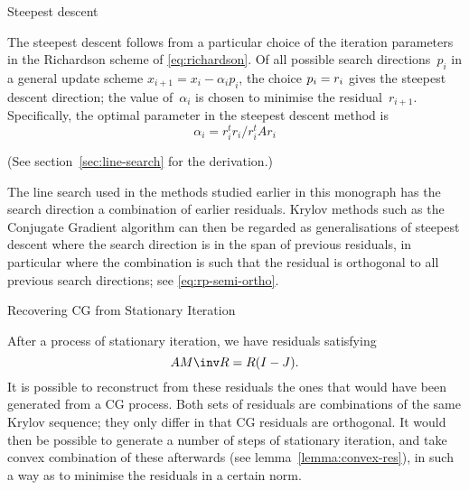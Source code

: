  {Steepest descent}
\label{sec:steepest-descent}

The steepest descent follows from a particular choice of the iteration
parameters in the Richardson scheme of \eqref{eq:richardson}.
Of all possible search directions~$p_i$ in a general update scheme
$x_{i+1}=x_i-\alpha_ip_i$, the choice $p_i=\nobreak r_i$ gives the
steepest descent direction; the value of~$\alpha_i$ is chosen to
minimise the residual~$r_{i+1}$. Specifically, the optimal parameter
in the steepest descent method is
\begin{equation}
    \alpha_i = r_i^tr_i/r_i^tAr_i
    \label{eq:steepest-descent-alpha}\end{equation}
\begin{truth}
(See section~\ref{sec:line-search} for the derivation.)
\end{truth}

The line search used in the methods studied earlier in this monograph
has the search direction a combination of earlier residuals. Krylov
methods such as the Conjugate Gradient algorithm can then be regarded
as generalisations of steepest descent where the search direction is
in the span of previous residuals, in particular where the combination
is such that the residual is orthogonal to all previous search
directions; see \eqref{eq:rp-semi-ortho}.

\begin{comment}
The matrix~$U$ satisfying $UH=JU$ contains the polynomial coefficients
of~$P_n$. For this particular matrix~$H$ we find (the unsurprising
fact) that the elements of~$U$ satisfy (see
lemma~\ref{lemma:polynomial:recurrence})
\[ -u_{in+1}=u_{i-1n}-u_{in}, \] 
that is, they are after some normalization
the coefficients of the polynomial $(1-x)^n$.
\end{comment}

 {Recovering CG from Stationary Iteration}
\label{sec:recover}

After a process of stationary iteration, we have residuals satisfying
\[ AM\inv R=R(I-J). \]
It is possible to reconstruct from these residuals the ones that would
have been generated from a CG process. Both sets of residuals are
combinations of the same Krylov sequence; they only differ in that CG
residuals are orthogonal. It would then be possible to generate a
number of steps of stationary iteration, and take convex combination
of these afterwards (see lemma~\ref{lemma:convex-res}), in such a way
as to minimise the residuals in a certain norm.


